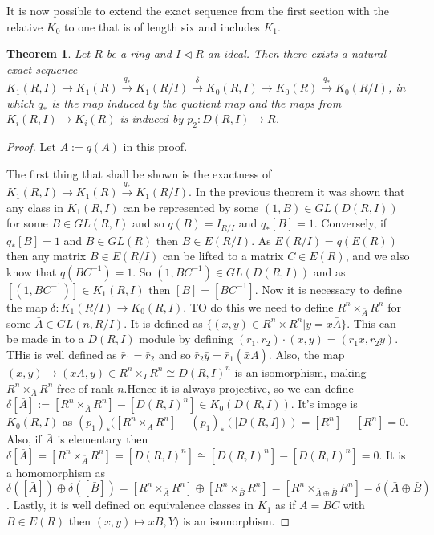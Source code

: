\documentclass[a4paper,10pt]{article}
\newtheorem{thm}{Theorem}[subsection]
\begin{document}
It is now possible to extend the exact sequence from the first section with the relative $K_{0}$ to one that is of length six and includes $K_{1}$.

\begin{thm}
Let $R$ be a ring and $I\triangleleft R$ an ideal. Then there exists a natural exact sequence $K_{1}(R,I)\rightarrow K_{1}(R)\stackrel{q_{*}}{\rightarrow} K_{1}(R/I)\stackrel{\delta}{\rightarrow} K_{0}(R,I)\rightarrow K_{0}(R)\stackrel{q_{*}}{\rightarrow} K_{0}(R/I)$, in which $q_{*}$ is the map induced by the quotient map and the maps from $K_{i}(R,I)\rightarrow K_{i}(R)$ is induced by $p_{2}:D(R,I)\rightarrow R$.
\end{thm}
\begin{proof}
Let $\bar{A}:=q(A)$ in this proof.

The first thing that shall be shown is the exactness of $K_{1}(R,I)\rightarrow K_{1}(R)\stackrel{q_{*}}{\rightarrow} K_{1}(R/I)$. In the previous theorem it was shown that any class in $K_{1}(R,I)$ can be represented by some $(1,B)\in GL(D(R,I))$ for some $B\in GL(R,I)$ and so $q(B)=I_{R/I}$ and $q_{*}[B]=1$. Conversely, if $q_{*}[B]=1$ and $B\in GL(R)$ then $\bar{B}\in E(R/I)$. As $E(R/I)=q(E(R))$ then any matrix $\bar{B}\in E(R/I)$ can be lifted to a matrix $C\in E(R)$, and we also know that $q(BC^{-1})=1$. So $(1,BC^{-1})\in GL(D(R,I))$ and as $[(1,BC^{-1})]\in K_{1}(R,I)$ then $[B]=[BC^{-1}]$.
\newline Now it is necessary to define the map $\delta:K_{1}(R/I)\rightarrow K_{0}(R,I)$. TO do this we need to define $R^{n}\times_{\bar{A}} R^{n}$ for some $\bar{A}\in GL(n,R/I)$. It is defined as $\{(x,y)\in R^{n}\times R^{n}|\bar{y}=\bar{x}\bar{A}\}$. This can be made in to a $D(R,I)$ module by defining $(r_{1},r_{2})\cdot(x,y)=(r_{1}x,r_{2}y)$. THis is well defined as $\bar{r}_{1}=\bar{r}_{2}$ and so $\bar{r}_{2}\bar{y}=\bar{r}_{1}(\bar{x}\bar{A})$. Also, the map $(x,y)\mapsto (xA,y)\in R^{n}\times_{I} R^{n}\cong D(R,I)^{n}$ is an isomorphism, making $R^{n}\times_{\bar{A}} R^{n}$ free of rank $n$.Hence it is always projective, so we can define $\delta [\bar{A}]:=[R^{n}\times_{\bar{A}} R^{n}]-[D(R,I)^{n}]\in K_{0}(D(R,I))$. It's image is $K_{0}(R,I)$ as $(p_{1})_{*}([R^{n}\times_{\bar{A}} R^{n}]-(p_{1})_{*}([D(R,I]))=[R^{n}]-[R^{n}]=0$. Also, if $\bar{A}$ is elementary then $\delta [\bar{A}]=[R^{n}\times_{\bar{A}} R^{n}]=[D(R,I)^{n}]\cong [D(R,I)^{n}]-[D(R,I)^{n}]=0$. It is a homomorphism as $\delta ([\bar{A}])\oplus \delta ([\bar{B}])=[R^{n}\times_{\bar{A}} R^{n}]\oplus [R^{n}\times_{\bar{B}} R^{n}]=[R^{n}\times_{\bar{A}\oplus\bar{B}} R^{n}]=\delta (\bar{A}\oplus \bar{B})$. Lastly, it is well defined on equivalence classes in $K_{1}$ as if $\bar{A}=\bar{B}\bar{C}$ with $B\in E(R)$ then $(x,y)\mapsto xB,Y)$ is an isomorphism.

\end{proof}
\end{document}
